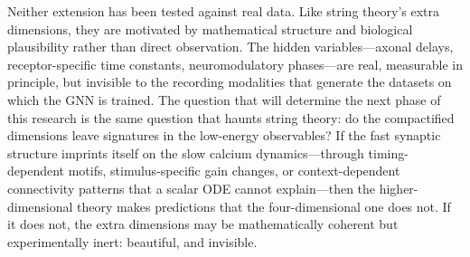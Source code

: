 \documentclass[11pt,twocolumn]{article}
\begin{document}
Neither extension has been tested against real data. Like string theory's extra dimensions, they are motivated by mathematical structure and biological plausibility rather than direct observation. The hidden variables---axonal delays, receptor-specific time constants, neuromodulatory phases---are real, measurable in principle, but invisible to the recording modalities that generate the datasets on which the GNN is trained. The question that will determine the next phase of this research is the same question that haunts string theory: do the compactified dimensions leave signatures in the low-energy observables? If the fast synaptic structure imprints itself on the slow calcium dynamics---through timing-dependent motifs, stimulus-specific gain changes, or context-dependent connectivity patterns that a scalar ODE cannot explain---then the higher-dimensional theory makes predictions that the four-dimensional one does not. If it does not, the extra dimensions may be mathematically coherent but experimentally inert: beautiful, and invisible.
\end{document}
